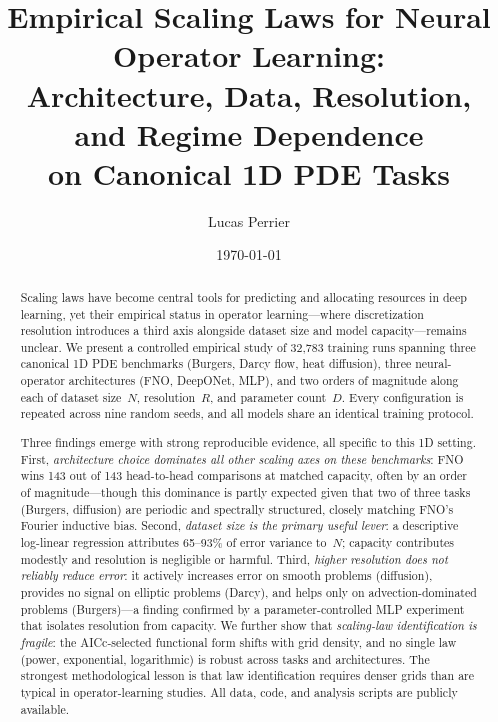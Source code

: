 \documentclass[11pt]{article}
\title{%
  Empirical Scaling Laws for Neural Operator Learning:\\
  Architecture, Data, Resolution, and Regime Dependence\\
  on Canonical 1D PDE Tasks%
}
\author{Lucas Perrier}
\date{\today}
\newcommand{\totalRuns}{32{,}783}
\begin{document}
\maketitle

\begin{abstract}
Scaling laws have become central tools for predicting and allocating
resources in deep learning, yet their empirical status in operator
learning---where discretization resolution introduces a third axis
alongside dataset size and model capacity---remains unclear.
We present a controlled empirical study of \totalRuns{} training runs
spanning three canonical 1D PDE benchmarks (Burgers, Darcy flow,
heat diffusion), three neural-operator architectures (FNO, DeepONet,
MLP), and two orders of magnitude along each of dataset size~$N$,
resolution~$R$, and parameter count~$D$.
Every configuration is repeated across nine random seeds, and all
models share an identical training protocol.

Three findings emerge with strong reproducible evidence,
all specific to this 1D setting.
First, \emph{architecture choice dominates all other scaling axes
on these benchmarks}:
FNO wins 143 out of 143 head-to-head comparisons at matched capacity,
often by an order of magnitude---though this dominance is partly
expected given that two of three tasks (Burgers, diffusion) are
periodic and spectrally structured, closely matching FNO's Fourier
inductive bias.
Second, \emph{dataset size is the primary useful lever}:
a descriptive log-linear regression attributes
65--93\% of error variance to~$N$;
capacity contributes modestly and resolution is negligible or harmful.
Third, \emph{higher resolution does not reliably reduce error}:
it actively increases error on smooth problems (diffusion), provides
no signal on elliptic problems (Darcy), and helps only on
advection-dominated problems (Burgers)---a finding confirmed by
a parameter-controlled MLP experiment that isolates resolution from
capacity.
We further show that \emph{scaling-law identification is fragile}:
the AICc-selected functional form shifts with grid density,
and no single law (power, exponential, logarithmic) is robust across
tasks and architectures.
The strongest methodological lesson is that law identification
requires denser grids than are typical in operator-learning studies.
All data, code, and analysis scripts are publicly available.
\end{abstract}


\end{document}
